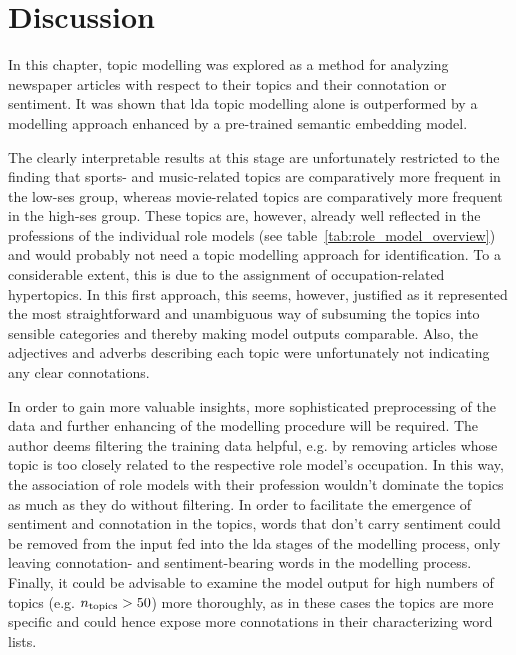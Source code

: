 \section{Discussion}
In this chapter, topic modelling was explored as a method for analyzing newspaper articles with respect to their topics and their connotation or sentiment. It was shown that \gls{lda} topic modelling alone is outperformed by a modelling approach enhanced by a pre-trained semantic embedding model.

The clearly interpretable results at this stage are unfortunately restricted to the  finding that sports- and music-related topics are comparatively more frequent in the low-\gls{ses} group, whereas movie-related topics are comparatively more frequent in the high-\gls{ses} group. These topics are, however, already well reflected in the professions of the individual role models (see table~\ref{tab:role_model_overview}) and would probably not need a topic modelling approach for identification. To a considerable extent, this is due to the assignment of occupation-related hypertopics. In this first approach, this seems, however, justified as it represented the most straightforward and unambiguous way of subsuming the topics into sensible categories and thereby making model outputs comparable. Also, the adjectives and adverbs describing each topic were unfortunately not indicating any clear connotations.

In order to gain more valuable insights, more sophisticated preprocessing of the data and further enhancing of the modelling procedure will be required. The author deems filtering the training data helpful, e.g. by removing articles whose topic is too closely related to the respective role model's occupation. In this way, the association of role models with their profession wouldn't dominate the topics as much as they do without filtering. In order to facilitate the emergence of sentiment and connotation in the topics, words that don't carry sentiment could be removed from the input fed into the \gls{lda} stages of the modelling process, only leaving connotation- and  sentiment-bearing words in the modelling process. Finally, it could be advisable to examine the model output for high numbers of topics (e.g. $n_\text{topics}>50$) more thoroughly, as in these cases the topics are more specific and could hence expose more connotations in their characterizing word lists.